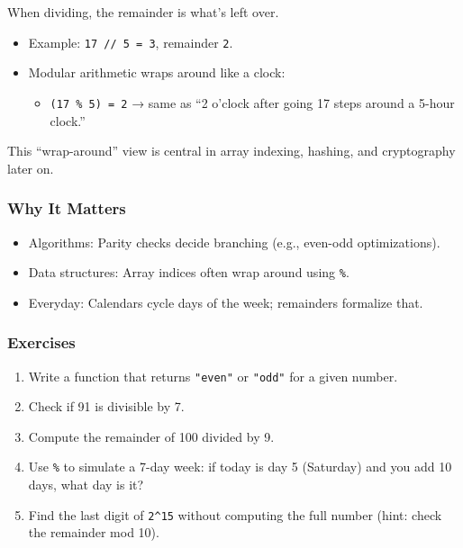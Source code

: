 \documentclass[
  letterpaper,
  DIV=11,
  numbers=noendperiod]{scrreprt}
\providecommand{\tightlist}{%
  \setlength{\itemsep}{0pt}\setlength{\parskip}{0pt}}
\begin{document}
When dividing, the remainder is what's left over.

\begin{itemize}
\item
  Example: \texttt{17\ //\ 5\ =\ 3}, remainder \texttt{2}.
\item
  Modular arithmetic wraps around like a clock:

  \begin{itemize}
  \tightlist
  \item
    \texttt{(17\ \%\ 5)\ =\ 2} → same as ``2 o'clock after going 17
    steps around a 5-hour clock.''
  \end{itemize}
\end{itemize}

This ``wrap-around'' view is central in array indexing, hashing, and
cryptography later on.

\subsubsection{Why It Matters}\label{why-it-matters-6}

\begin{itemize}
\tightlist
\item
  Algorithms: Parity checks decide branching (e.g., even-odd
  optimizations).
\item
  Data structures: Array indices often wrap around using \texttt{\%}.
\item
  Everyday: Calendars cycle days of the week; remainders formalize that.
\end{itemize}

\subsubsection{Exercises}\label{exercises-6}

\begin{enumerate}
\def\labelenumi{\arabic{enumi}.}
\tightlist
\item
  Write a function that returns \texttt{"even"} or \texttt{"odd"} for a
  given number.
\item
  Check if 91 is divisible by 7.
\item
  Compute the remainder of 100 divided by 9.
\item
  Use \texttt{\%} to simulate a 7-day week: if today is day 5 (Saturday)
  and you add 10 days, what day is it?
\item
  Find the last digit of \texttt{2\^{}15} without computing the full
  number (hint: check the remainder mod 10).
\end{enumerate}
\end{document}
